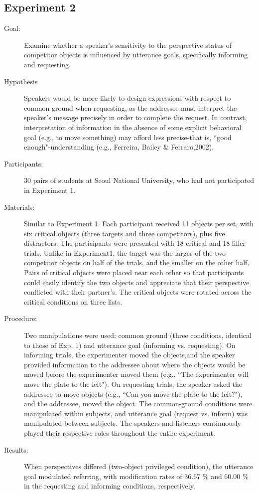 \documentclass{article}
\begin{document}
\begin{multicols}{2}
\subsection{Experiment 2}
\begin{description}
	\item[Goal:] Examine whether a speaker's sensitivity to the perspective status of competitor objects is influenced by utterance goals, specifically informing and requesting.
	\item[Hypothesis] Speakers would be more likely to design expressions with respect to common ground when requesting, as the addressee must interpret the speaker's message precisely in order to complete the request. In contrast, interpretation of information in the absence of some explicit behavioral goal (e.g., to move something) may afford less precise-that is, \textquotedblleft good enough"-understanding (e.g., Ferreira, Bailey \& Ferraro,2002).
	\item[Participants:] 30 pairs of students at Seoul National University, who had not participated in Experiment 1.
	\item[Materials:] Similar to Experiment 1. Each participant received 11 objects per set, with six critical objects (three targets and three competitors), plus five distractors. The participants were presented with 18 critical and 18 filler trials. Unlike in Experiment1, the target was the larger of the two competitor objects on half of the trials, and the smaller on the other half. Pairs of critical objects were placed near each other so that participants could easily identify the two objects and appreciate that their perspective conflicted with their partner's. The critical objects were rotated across the critical conditions on three lists.
	\item[Procedure:] Two manipulations were used: common ground (three conditions, identical to those of Exp. 1) and utterance goal (informing vs. requesting). On informing trials, the experimenter moved the objects,and the speaker provided information to the addressee about where the objects would be moved before the experimenter moved them (e.g., \textquotedblleft The experimenter will move the plate to the left"). On requesting trials, the speaker asked the addressee to move objects (e.g., \textquotedblleft Can you move the plate to the left?"), and the addressee, moved the object. The common-ground conditions were manipulated within subjects, and utterance goal (request vs. inform) was manipulated between subjects. The speakers and listeners continuously played their respective roles throughout the entire experiment. 
	\item[Results:]When perspectives differed (two-object privileged condition), the utterance goal modulated referring, with modification rates of 36.67 \% and 60.00 \% in the requesting and informing conditions, respectively.\\\vspace{4mm}
	

\end{description}
\end{multicols}
\end{document}
